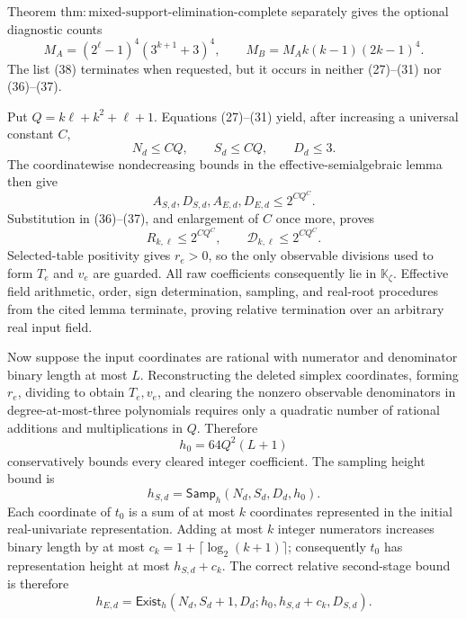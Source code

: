 Theorem \(\mathrm{thm{:}mixed\text{-}support\text{-}elimination\text{-}complete}\) separately gives the optional diagnostic counts
\[
 M_A=(2^{\ell}-1)^4(3^{k+1}+3)^4,
 \qquad
 M_B=M_Ak(k-1)(2k-1)^4.                                  \tag{38}
\]
The list (38) terminates when requested, but it occurs in neither (27)--(31) nor (36)--(37).

Put \(Q=k\ell+k^2+\ell+1\).  Equations (27)--(31) yield, after increasing a universal constant \(C\),
\[
 N_d\le CQ,\qquad S_d\le CQ,\qquad D_d\le3.             \tag{39}
\]
The coordinatewise nondecreasing bounds in the effective-semialgebraic lemma then give
\[
 A_{S,d},D_{S,d},A_{E,d},D_{E,d}
 \le 2^{CQ^C}.                                             \tag{40}
\]
Substitution in (36)--(37), and enlargement of \(C\) once more, proves
\[
 R_{k,\ell}\le2^{CQ^C},
 \qquad
 \mathcal D_{k,\ell}\le2^{CQ^C}.                        \tag{41}
\]
Selected-table positivity gives \(r_e>0\), so the only observable divisions used to form \(T_e\) and \(v_e\) are guarded.  All raw coefficients consequently lie in \(\mathbb K_{\zeta}\).  Effective field arithmetic, order, sign determination, sampling, and real-root procedures from the cited lemma terminate, proving relative termination over an arbitrary real input field.

Now suppose the input coordinates are rational with numerator and denominator binary length at most \(L\).  Reconstructing the deleted simplex coordinates, forming \(r_e\), dividing to obtain \(T_e,v_e\), and clearing the nonzero observable denominators in degree-at-most-three polynomials requires only a quadratic number of rational additions and multiplications in \(Q\).  Therefore
\[
 h_0=64Q^2(L+1)                                            \tag{42}
\]
conservatively bounds every cleared integer coefficient.  The sampling height bound is
\[
 h_{S,d}=\mathsf{Samp}_h(N_d,S_d,D_d,h_0).                 \tag{43}
\]
Each coordinate of \(t_0\) is a sum of at most \(k\) coordinates represented in the initial real-univariate representation.  Adding at most \(k\) integer numerators increases binary length by at most
\(c_k=1+\lceil\log_2(k+1)\rceil\); consequently \(t_0\) has representation height at most \(h_{S,d}+c_k\).  The correct relative second-stage bound is therefore
\[
 h_{E,d}=\mathsf{Exist}_h
 (N_d,S_d+1,D_d;h_0,h_{S,d}+c_k,D_{S,d}).                  \tag{44}
\]

